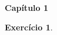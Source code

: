 \documentclass[11pt,leqno,final]{amsart}
\theoremstyle{definition}
\newtheorem{exec}{Exercício}
\begin{document}
\renewcommand{\baselinestretch}{1.4}

\begin{center}
    \textbf{Capítulo 1}
\end{center}

\begin{exec}
\end{exec}
\end{document}

